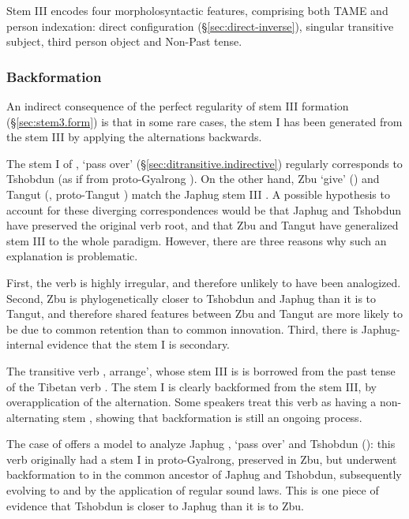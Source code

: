 Stem III encodes four morpholosyntactic features, comprising both TAME and person indexation: direct configuration (§\ref{sec:direct-inverse}), singular transitive subject, third person object and Non-Past tense.

\subsubsection{Backformation} \label{sec:stem3.backformation}
An indirect consequence of the perfect regularity of stem III formation (§\ref{sec:stem3.form}) is that in some rare cases, the stem I has been generated from the stem III by applying the alternations backwards.

The stem I of , `pass over' (§\ref{sec:ditransitive.indirective}) regularly corresponds to Tshobdun  (as if from proto-Gyalrong ). On the other hand, Zbu  `give' (\citealt[229]{gong18these}) and Tangut   (\citealt[200--201]{jacques14esquisse}, proto-Tangut ) match the Japhug stem III . A possible hypothesis to account for these diverging correspondences would be that Japhug and Tshobdun have preserved the original verb root, and that Zbu and Tangut have generalized stem III to the whole paradigm. However, there are three reasons why such an explanation is problematic. 

First, the verb  is highly irregular, and therefore unlikely to have been analogized. Second, Zbu is phylogenetically closer to Tshobdun and Japhug than it is to Tangut, and therefore shared features between Zbu and Tangut are more likely to be due to common retention than to common innovation. Third, there is Japhug-internal evidence that the stem I  is secondary.

The transitive verb , arrange', whose stem III is  is borrowed from the past tense of the Tibetan verb . The stem I  is clearly backformed from the stem III, by overapplication of the  alternation. Some speakers treat this verb as having a non-alternating stem , showing that backformation is still an ongoing process.

The case of  offers a model to analyze Japhug , `pass over' and Tshobdun  (\citealt[201]{jacques14esquisse}): this verb originally had a stem I  in proto-Gyalrong, preserved in Zbu, but underwent backformation to  in the common ancestor of Japhug and Tshobdun, subsequently evolving to  and  by the application of regular sound laws. This is one piece of evidence that Tshobdun is closer to Japhug than it is to Zbu.

